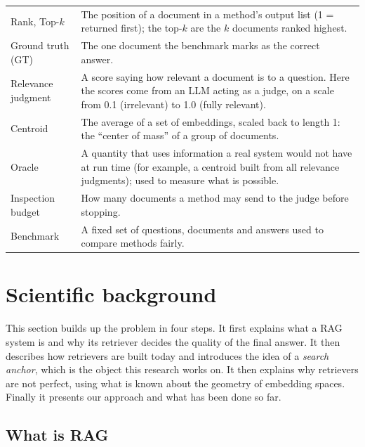 \documentclass[12pt,a4paper]{article}
\begin{document}
\begin{minipage}{\textwidth}
\begin{tabularx}{\textwidth}{>{\raggedright\arraybackslash}p{3.7cm}>{\raggedright\arraybackslash}X}
Rank, Top-$k$ & The position of a document in a method's output list (1 = returned first); the top-$k$ are the $k$ documents ranked highest. \\
Ground truth (GT) & The one document the benchmark marks as the correct answer. \\
Relevance judgment & A score saying how relevant a document is to a question. Here the scores come from an LLM acting as a judge, on a scale from 0.1 (irrelevant) to 1.0 (fully relevant). \\
Centroid & The average of a set of embeddings, scaled back to length 1: the ``center of mass'' of a group of documents. \\
Oracle & A quantity that uses information a real system would not have at run time (for example, a centroid built from all relevance judgments); used to measure what is possible. \\
Inspection budget & How many documents a method may send to the judge before stopping. \\
Benchmark & A fixed set of questions, documents and answers used to compare methods fairly. \\
\bottomrule
\end{tabularx}
\end{minipage}


\section{Scientific background}

This section builds up the problem in four steps. It first explains what a RAG system is and why its retriever decides the quality of the final answer. It then describes how retrievers are built today and introduces the idea of a \emph{search anchor}, which is the object this research works on. It then explains why retrievers are not perfect, using what is known about the geometry of embedding spaces. Finally it presents our approach and what has been done so far.

\subsection{What is RAG}
\end{document}
